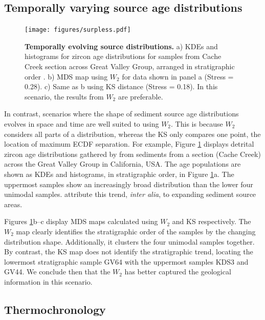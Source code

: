 \documentclass[gchron, manuscript]{copernicus}
\begin{document}
\subsection{Temporally varying source age distributions}

\begin{figure}
    \centering
    \texttt{[image: figures/surpless.pdf]}
    \caption{\textbf{Temporally evolving source distributions.} a) KDEs and histograms for zircon age distributions for samples from Cache Creek section across Great Valley Group, arranged in stratigraphic order \citep{degraaff-surpless_detrital_2002}. b) MDS map using $W_2$ for data shown in panel a (Stress = 0.28). c) Same as b using KS distance (Stress = 0.18). In this scenario, the results from $W_2$ are preferable. } 
    \label{fig:surpless}
\end{figure}

In contrast, scenarios where the shape of sediment source age distributions evolves in space and time are well suited to using $W_2$. This is because $W_2$ considers all parts of a distribution, whereas the KS only compares one point, the location of maximum ECDF separation. For example, Figure \ref{fig:surpless} displays detrital zircon age distributions gathered by \citet{degraaff-surpless_detrital_2002} from sediments from a section (Cache Creek) across the Great Valley Group in California, USA. The age populations are shown as KDEs and histograms, in stratigraphic order, in Figure \ref{fig:surpless}a. The uppermost samples show an increasingly broad distribution than the lower four unimodal samples. \citet{degraaff-surpless_detrital_2002} attribute this trend, \textit{inter alia}, to expanding sediment source areas. 

Figures \ref{fig:surpless}b--c display MDS maps calculated using $W_2$ and KS respectively. The $W_2$ map clearly identifies the stratigraphic order of the samples by the changing distribution shape. Additionally, it clusters the four unimodal samples together. By contrast, the KS map does not identify the stratigraphic trend, locating the lowermost stratigraphic sample GV64 with the uppermost samples KDS3 and GV44. We conclude then that the $W_2$ has better captured the geological information in this scenario.

\subsection{Thermochronology}
\end{document}
